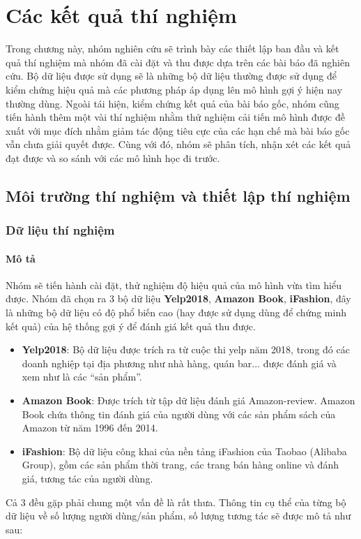 \chapter{Các kết quả thí nghiệm}
\label{Chapter4}

\noindent Trong chương này, nhóm nghiên cứu sẽ trình bày các thiết lập ban đầu và kết quả thí nghiệm mà nhóm đã cài đặt và thu được dựa trên các bài báo đã nghiên cứu. Bộ dữ liệu được sử dụng sẽ là những bộ dữ liệu thường được sử dụng để kiểm chứng hiệu quả mà các phương pháp áp dụng lên mô hình gợi ý hiện nay thường dùng. Ngoài tái hiện, kiểm chứng kết quả của bài báo gốc, nhóm cũng tiến hành thêm một vài thí nghiệm nhằm thử nghiệm cải tiến mô hình được đề xuất với mục đích nhằm giảm tác động tiêu cực của các hạn chế mà bài báo gốc vẫn chưa giải quyết được. Cùng với đó, nhóm sẽ phân tích, nhận xét các kết quả đạt được và so sánh với các mô hình học đi trước.

\section{Môi trường thí nghiệm và thiết lập thí nghiệm}

\subsection{Dữ liệu thí nghiệm}

\subsubsection{Mô tả}
\noindent Nhóm sẽ tiến hành cài đặt, thử nghiệm độ hiệu quả của mô hình vừa tìm hiểu được. Nhóm đã chọn ra 3 bộ dữ liệu \textbf{Yelp2018}, \textbf{Amazon Book}, \textbf{iFashion}, đây là những bộ dữ liệu có độ phổ biến cao (hay được sử dụng dùng để chứng minh kết quả) của hệ thống gợi ý để đánh giá kết quả thu được.
\begin{itemize}
    \item[] \textbf{Yelp2018}: Bộ dữ liệu được trích ra từ cuộc thi yelp năm 2018, trong đó các doanh nghiệp tại địa phương như nhà hàng, quán bar... được đánh giá và xem như là các ``sản phẩm''.

    \item[] \textbf{Amazon Book}: Được trích từ tập dữ liệu đánh giá Amazon-review. Amazon Book chứa thông tin đánh giá của người dùng với các sản phẩm sách của Amazon từ năm 1996 đến 2014.

    \item[] \textbf{iFashion}: Bộ dữ liệu công khai của nền tảng iFashion của Taobao (Alibaba Group), gồm các sản phẩm thời trang, các trang bán hàng online và đánh giá, tương tác của người dùng.
\end{itemize}
Cả 3 đều gặp phải chung một vấn đề là rất thưa. Thông tin cụ thể của từng bộ dữ liệu về số lượng người dùng/sản phẩm, số lượng tương tác sẽ được mô tả như sau:

